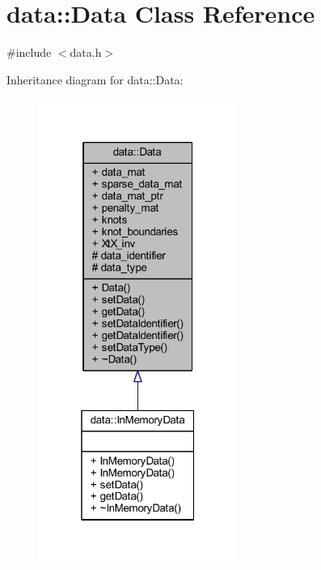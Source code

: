 \hypertarget{classdata_1_1_data}{}\section{data\+:\+:Data Class Reference}
\label{classdata_1_1_data}


{\ttfamily \#include $<$data.\+h$>$}



Inheritance diagram for data\+:\+:Data\+:\nopagebreak
\begin{figure}[H]
\begin{center}
\leavevmode
\includegraphics[width=184pt]{classdata_1_1_data__inherit__graph}
\end{center}
\end{figure}


